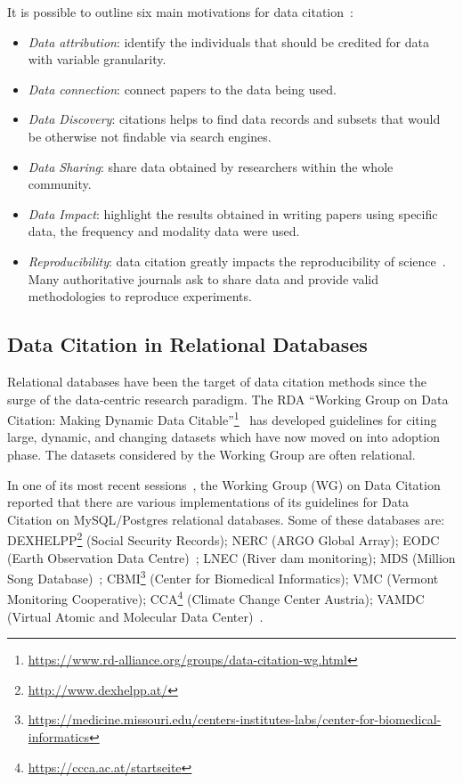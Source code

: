 
It is possible to outline six main motivations for data citation~\citep{Silvello18jasist}:
\begin{itemize}
	\item \emph{Data attribution}: identify the individuals that should be credited for data with variable granularity.
	\item \emph{Data connection}: connect papers to the data being used.
    \item \emph{Data Discovery}: citations helps to find data records and subsets that would be otherwise not findable via search engines.
    \item \emph{Data Sharing}: share data obtained by researchers within the whole community. 
    \item \emph{Data Impact}: highlight the results obtained in writing papers using specific data, the frequency and modality data were used.
    \item \emph{Reproducibility}: data citation greatly impacts the reproducibility of science~\citep{baggerly2010disclose}. Many authoritative journals ask to share data and provide valid methodologies to reproduce experiments.
\end{itemize}

\subsection{Data Citation in Relational Databases}
Relational databases have been the target of data citation methods since the surge of the data-centric research paradigm. 
The RDA ``Working Group on Data Citation: Making Dynamic Data Citable''\footnote{\url{https://www.rd-alliance.org/groups/data-citation-wg.html}}~\citep{RauberEtAl2016} has developed guidelines for citing large, dynamic, and changing datasets which have now moved on into adoption phase. The datasets considered by the Working Group are often relational.

In one of its most recent sessions~\citep{rauber2015data}, the Working Group (WG) on Data Citation reported that there are various implementations of its guidelines for Data Citation on MySQL/Postgres relational databases. 
Some of these databases are: DEXHELPP\footnote{\url{http://www.dexhelpp.at/}} (Social Security Records); NERC (ARGO Global Array); EODC (Earth Observation Data Centre)~\citep{gosswein2019data}; LNEC (River dam monitoring); MDS (Million Song Database)~\citep{bertin2011million}; CBMI\footnote{\url{https://medicine.missouri.edu/centers-institutes-labs/center-for-biomedical-informatics}} (Center for Biomedical Informatics); VMC (Vermont Monitoring Cooperative); CCA\footnote{\url{https://ccca.ac.at/startseite}} (Climate Change Center Austria); VAMDC (Virtual Atomic and Molecular Data Center)~\citep{Dubernet_2016, ZwolfEtAl2016}.

